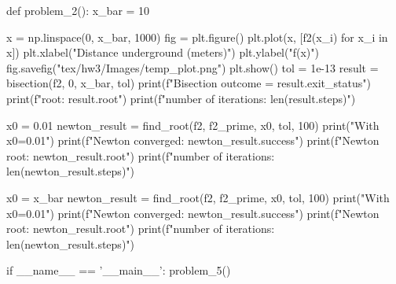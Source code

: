 \documentclass{homework}
\begin{document}
\begin{python}
def problem_2():
    x_bar = 10

    x = np.linspace(0, x_bar, 1000)
    fig = plt.figure()
    plt.plot(x, [f2(x_i) for x_i in x])
    plt.xlabel("Distance underground (meters)")
    plt.ylabel("f(x)")
    fig.savefig("tex/hw3/Images/temp_plot.png")
    plt.show()
    tol = 1e-13
    result = bisection(f2, 0, x_bar, tol)
    print(f"Bisection outcome = {result.exit_status}")
    print(f"root: {result.root}")
    print(f"number of iterations: {len(result.steps)}")

    x0 = 0.01
    newton_result = find_root(f2, f2_prime, x0, tol, 100)
    print("With x0=0.01")
    print(f"Newton converged:  {newton_result.success}")
    print(f"Newton root:  {newton_result.root}")
    print(f"number of iterations: {len(newton_result.steps)}")

    x0 = x_bar
    newton_result = find_root(f2, f2_prime, x0, tol, 100)
    print("With x0=0.01")
    print(f"Newton converged:  {newton_result.success}")
    print(f"Newton root:  {newton_result.root}")
    print(f"number of iterations: {len(newton_result.steps)}")

if __name__ == '__main__':
    problem_5()


\end{python}
\end{document}
